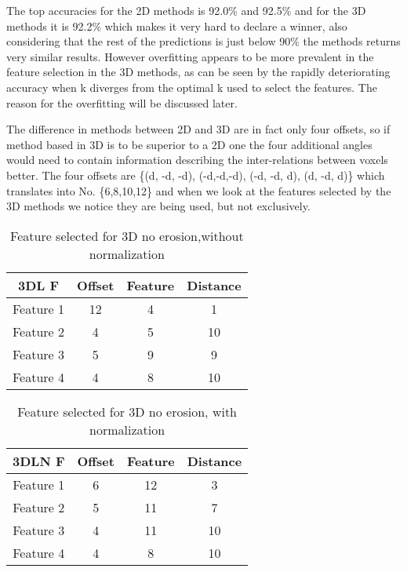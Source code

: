 The top accuracies for the 2D methods is 92.0\% and 92.5\% and for the 3D methods it is 92.2\% which makes it very hard to declare a winner, also considering that the rest of the predictions is just below 90\% the methods returns very similar results. However overfitting appears to be more prevalent in the feature selection in the 3D methods, as can be seen by the rapidly deteriorating accuracy when k diverges from the optimal k used to select the features. The reason for the overfitting will be discussed later.

The difference in methods between 2D and 3D are in fact only four offsets, so if method based in 3D is to be superior to a 2D one the four additional angles would need to contain information describing the inter-relations between voxels better. The four offsets are \{(d, -d, -d), (-d,-d,-d), (-d, -d, d), (d, -d, d)\} which translates into No. \{6,8,10,12\} and when we look at the features selected by the 3D methods we notice they are being used, but not exclusively.
\begin{table}[H]
  \centering
    \begin{tabular}{|c|c|c|c|}
    \hline
    3DL F & Offset & Feature & Distance \\ \hline
    Feature 1 & 12    & 4     & 1 \\ \hline
    Feature 2 & 4     & 5     & 10 \\ \hline
    Feature 3 & 5     & 9     & 9 \\ \hline
    Feature 4 & 4     & 8     & 10 \\ \hline
    \end{tabular}%
 \caption{Feature selected for 3D no erosion,without normalization}\label{tab:3DL F}%
\end{table}%
\begin{table}[H]
  \centering
    \begin{tabular}{|c|c|c|c|}
     \hline
    3DLN F & Offset & Feature & Distance \\ \hline
    Feature 1 & 6     & 12    & 3 \\ \hline
    Feature 2 & 5     & 11    & 7 \\ \hline
    Feature 3 & 4     & 11    & 10 \\ \hline
    Feature 4 & 4     & 8     & 10 \\ \hline
    \end{tabular}%
 \caption{Feature selected for 3D no erosion, with normalization}\label{tab:3DLN F}%
\end{table}%


